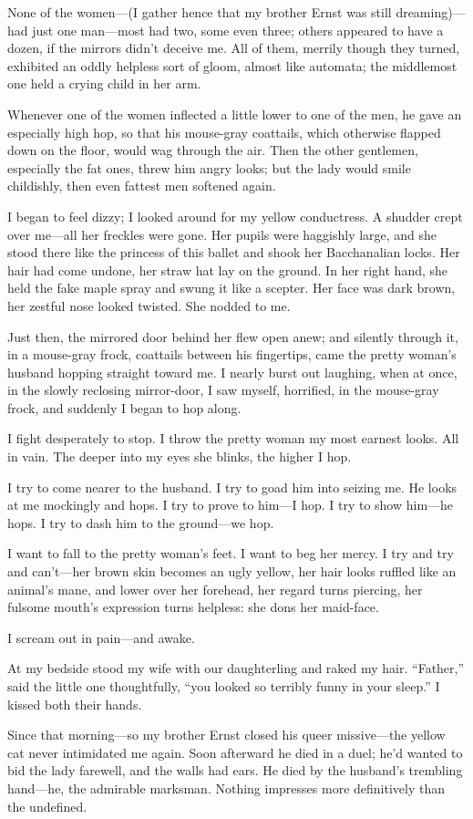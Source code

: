 \documentclass[12pt,a4paper]{article}
\begin{document}
None of the women—(I gather hence that my brother Ernst was still dreaming)—had just one man—most had two, some even three; others appeared to have a dozen, if the mirrors didn’t deceive me. All of them, merrily though they turned, exhibited an oddly helpless sort of gloom, almost like automata; the middlemost one held a crying child in her arm. 

Whenever one of the women inflected a little lower to one of the men, he gave an especially high hop, so that his mouse-gray coattails, which otherwise flapped down on the floor, would wag through the air. Then the other gentlemen, especially the fat ones, threw him angry looks; but the lady would smile childishly, then even fattest men softened again.

I began to feel dizzy; I looked around for my yellow conductress. A shudder crept over me—all her freckles were gone. Her pupils were haggishly large, and she stood there like the princess of this ballet and shook her Bacchanalian locks. Her hair had come undone, her straw hat lay on the ground. In her right hand, she held the fake maple spray and swung it like a scepter. Her face was dark brown, her zestful nose looked twisted. She nodded to me.

Just then, the mirrored door behind her flew open anew; and silently through it, in a mouse-gray frock, coattails between his fingertips, came the pretty woman’s husband hopping straight toward me. I nearly burst out laughing, when at once, in the slowly reclosing mirror-door, I saw myself, horrified, in the mouse-gray frock, and suddenly I began to hop along.

I fight desperately to stop. I throw the pretty woman my most earnest looks. All in vain. The deeper into my eyes she blinks, the higher I hop.

I try to come nearer to the husband. I try to goad him into seizing me. He looks at me mockingly and hops. I try to prove to him—I hop. I try to show him—he hops. I try to dash him to the ground—we hop.

I want to fall to the pretty woman’s feet. I want to beg her mercy. I try and try and can’t—her brown skin becomes an ugly yellow, her hair looks ruffled like an animal’s mane, and lower over her forehead, her regard turns piercing, her fulsome mouth’s expression turns helpless: she dons her maid-face.

I scream out in pain—and awake.

At my bedside stood my wife with our daughterling and raked my hair. “Father,” said the little one thoughtfully, “you looked so terribly funny in your sleep.” I kissed both their hands.

Since that morning—so my brother Ernst closed his queer missive—the yellow cat never intimidated me again. Soon afterward he died in a duel; he’d wanted to bid the lady farewell, and the walls had ears. He died by the husband’s trembling hand—he, the admirable marksman. Nothing impresses more definitively than the undefined.
\end{document}
